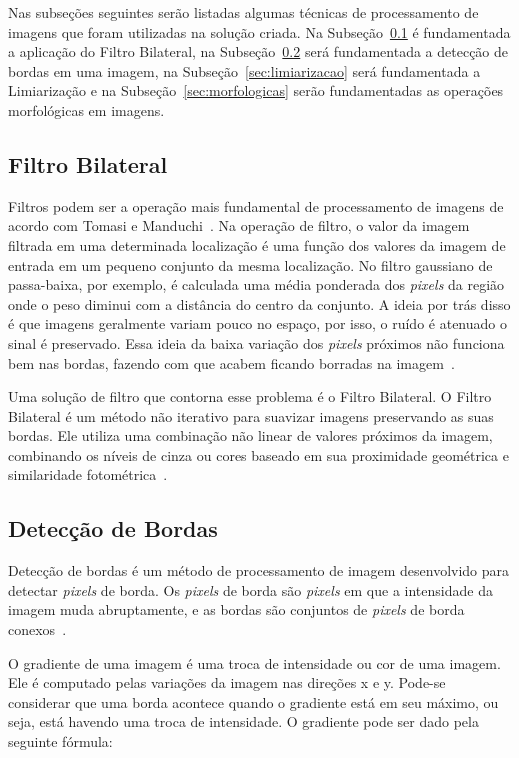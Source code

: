Nas subseções seguintes serão listadas algumas técnicas de processamento de imagens que foram utilizadas na solução criada. Na Subseção~\ref{sec:bilateralfilter} é fundamentada a aplicação do Filtro Bilateral, na Subseção~\ref{sec:detecbordas} será fundamentada a detecção de bordas em uma imagem, na Subseção~\ref{sec:limiarizacao} será fundamentada a Limiarização e na Subseção~\ref{sec:morfologicas} serão fundamentadas as operações morfológicas em imagens.

\subsection{Filtro Bilateral}
\label{sec:bilateralfilter}

Filtros podem ser a operação mais fundamental de processamento de imagens de acordo com Tomasi e Manduchi~\cite{tomasi1998bilateral}. Na operação de filtro, o valor da imagem filtrada em uma determinada localização é uma função dos valores da imagem de entrada em um pequeno conjunto da mesma localização. No filtro gaussiano de passa-baixa, por exemplo, é calculada uma média ponderada dos \emph{pixels} da região onde o peso diminui com a distância do centro da conjunto. A ideia por trás disso é que imagens geralmente variam pouco no espaço, por isso, o ruído é atenuado o sinal é preservado. Essa ideia da baixa variação dos \emph{pixels} próximos não funciona bem nas bordas, fazendo com que acabem ficando borradas na imagem~\cite{tomasi1998bilateral}.

Uma solução de filtro que contorna esse problema é o Filtro Bilateral. O Filtro Bilateral é um método não iterativo para suavizar imagens preservando as suas bordas. Ele utiliza uma combinação não linear de valores próximos da imagem, combinando os níveis de cinza ou cores baseado em sua proximidade geométrica e similaridade fotométrica~\cite{tomasi1998bilateral}.

\subsection{Detecção de Bordas}
\label{sec:detecbordas}

Detecção de bordas é um método de processamento de imagem desenvolvido para detectar \emph{pixels} de borda. Os \emph{pixels} de borda são \emph{pixels} em que a intensidade da imagem muda abruptamente, e as bordas são conjuntos de \emph{pixels} de borda conexos~\cite{gonzalez1977digital}.

O gradiente de uma imagem é uma troca de intensidade ou cor de uma imagem. Ele é computado pelas variações da imagem nas direções x e y. Pode-se considerar que uma borda acontece quando o gradiente está em seu máximo, ou seja, está havendo uma troca de intensidade. O gradiente pode ser dado pela seguinte fórmula:

